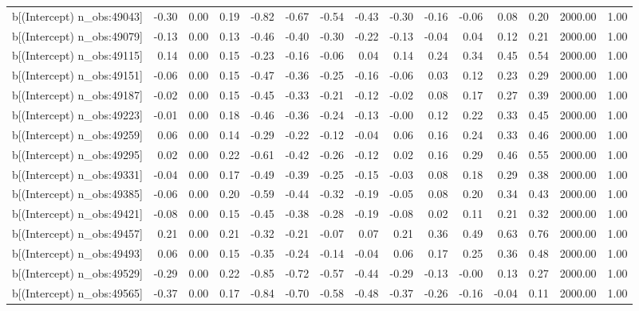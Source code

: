 \begin{table}[ht]
\begin{tabular}{rrrrrrrrrrrrrrr}
  b[(Intercept) n\_obs:49043] & -0.30 & 0.00 & 0.19 & -0.82 & -0.67 & -0.54 & -0.43 & -0.30 & -0.16 & -0.06 & 0.08 & 0.20 & 2000.00 & 1.00 \\ 
  b[(Intercept) n\_obs:49079] & -0.13 & 0.00 & 0.13 & -0.46 & -0.40 & -0.30 & -0.22 & -0.13 & -0.04 & 0.04 & 0.12 & 0.21 & 2000.00 & 1.00 \\ 
  b[(Intercept) n\_obs:49115] & 0.14 & 0.00 & 0.15 & -0.23 & -0.16 & -0.06 & 0.04 & 0.14 & 0.24 & 0.34 & 0.45 & 0.54 & 2000.00 & 1.00 \\ 
  b[(Intercept) n\_obs:49151] & -0.06 & 0.00 & 0.15 & -0.47 & -0.36 & -0.25 & -0.16 & -0.06 & 0.03 & 0.12 & 0.23 & 0.29 & 2000.00 & 1.00 \\ 
  b[(Intercept) n\_obs:49187] & -0.02 & 0.00 & 0.15 & -0.45 & -0.33 & -0.21 & -0.12 & -0.02 & 0.08 & 0.17 & 0.27 & 0.39 & 2000.00 & 1.00 \\ 
  b[(Intercept) n\_obs:49223] & -0.01 & 0.00 & 0.18 & -0.46 & -0.36 & -0.24 & -0.13 & -0.00 & 0.12 & 0.22 & 0.33 & 0.45 & 2000.00 & 1.00 \\ 
  b[(Intercept) n\_obs:49259] & 0.06 & 0.00 & 0.14 & -0.29 & -0.22 & -0.12 & -0.04 & 0.06 & 0.16 & 0.24 & 0.33 & 0.46 & 2000.00 & 1.00 \\ 
  b[(Intercept) n\_obs:49295] & 0.02 & 0.00 & 0.22 & -0.61 & -0.42 & -0.26 & -0.12 & 0.02 & 0.16 & 0.29 & 0.46 & 0.55 & 2000.00 & 1.00 \\ 
  b[(Intercept) n\_obs:49331] & -0.04 & 0.00 & 0.17 & -0.49 & -0.39 & -0.25 & -0.15 & -0.03 & 0.08 & 0.18 & 0.29 & 0.38 & 2000.00 & 1.00 \\ 
  b[(Intercept) n\_obs:49385] & -0.06 & 0.00 & 0.20 & -0.59 & -0.44 & -0.32 & -0.19 & -0.05 & 0.08 & 0.20 & 0.34 & 0.43 & 2000.00 & 1.00 \\ 
  b[(Intercept) n\_obs:49421] & -0.08 & 0.00 & 0.15 & -0.45 & -0.38 & -0.28 & -0.19 & -0.08 & 0.02 & 0.11 & 0.21 & 0.32 & 2000.00 & 1.00 \\ 
  b[(Intercept) n\_obs:49457] & 0.21 & 0.00 & 0.21 & -0.32 & -0.21 & -0.07 & 0.07 & 0.21 & 0.36 & 0.49 & 0.63 & 0.76 & 2000.00 & 1.00 \\ 
  b[(Intercept) n\_obs:49493] & 0.06 & 0.00 & 0.15 & -0.35 & -0.24 & -0.14 & -0.04 & 0.06 & 0.17 & 0.25 & 0.36 & 0.48 & 2000.00 & 1.00 \\ 
  b[(Intercept) n\_obs:49529] & -0.29 & 0.00 & 0.22 & -0.85 & -0.72 & -0.57 & -0.44 & -0.29 & -0.13 & -0.00 & 0.13 & 0.27 & 2000.00 & 1.00 \\ 
  b[(Intercept) n\_obs:49565] & -0.37 & 0.00 & 0.17 & -0.84 & -0.70 & -0.58 & -0.48 & -0.37 & -0.26 & -0.16 & -0.04 & 0.11 & 2000.00 & 1.00 \\ 

\end{tabular}
\end{table}
